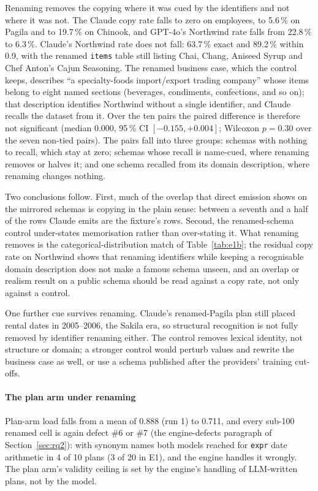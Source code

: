\documentclass[preprint,12pt]{elsarticle}
\begin{document}
Renaming removes the copying where it was cued by the identifiers and not where it was not. The Claude copy rate falls to zero on employees, to 5.6\,\% on Pagila and to 19.7\,\% on Chinook, and GPT-4o's Northwind rate falls from 22.8\,\% to 6.3\,\%. Claude's Northwind rate does not fall: 63.7\,\% exact and 89.2\,\% within 0.9, with the renamed \texttt{items} table still listing Chai, Chang, Aniseed Syrup and Chef Anton's Cajun Seasoning. The renamed business case, which the control keeps, describes ``a specialty-foods import/export trading company'' whose items belong to eight named sections (beverages, condiments, confections, and so on); that description identifies Northwind without a single identifier, and Claude recalls the dataset from it. Over the ten pairs the paired difference is therefore not significant (median 0.000, 95\,\% CI $[-0.155, +0.004]$; Wilcoxon $p=0.30$ over the seven non-tied pairs). The pairs fall into three groups: schemas with nothing to recall, which stay at zero; schemas whose recall is name-cued, where renaming removes or halves it; and one schema recalled from its domain description, where renaming changes nothing.

Two conclusions follow. First, much of the overlap that direct emission shows on the mirrored schemas is copying in the plain sense: between a seventh and a half of the rows Claude emits are the fixture's rows. Second, the renamed-schema control under-states memorisation rather than over-stating it. What renaming removes is the categorical-distribution match of Table~\ref{tab:e1b}; the residual copy rate on Northwind shows that renaming identifiers while keeping a recognisable domain description does not make a famous schema unseen, and an overlap or realism result on a public schema should be read against a copy rate, not only against a control.

One further cue survives renaming. Claude's renamed-Pagila plan still placed rental dates in 2005--2006, the Sakila era, so structural recognition is not fully removed by identifier renaming either. The control removes lexical identity, not structure or domain; a stronger control would perturb values and rewrite the business case as well, or use a schema published after the providers' training cut-offs.

\paragraph{The plan arm under renaming} Plan-arm load falls from a mean of 0.888 (run 1) to 0.711, and every sub-100 renamed cell is again defect \#6 or \#7 (the engine-defects paragraph of Section~\ref{sec:rq2}): with synonym names both models reached for \texttt{expr} date arithmetic in 4 of 10 plans (3 of 20 in E1), and the engine handles it wrongly. The plan arm's validity ceiling is set by the engine's handling of LLM-written plans, not by the model.
\end{document}
